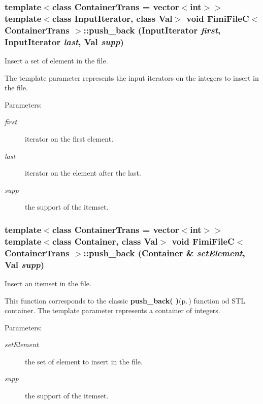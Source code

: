\subsubsection{\setlength{\rightskip}{0pt plus 5cm}template$<$class Container\-Trans = vector$<$int$>$$>$ template$<$class Input\-Iterator, class Val$>$ void {\bf Fimi\-File\-C}$<$ Container\-Trans $>$::push\_\-back (Input\-Iterator {\em first}, Input\-Iterator {\em last}, Val {\em supp})\hspace{0.3cm}{\tt  [inline]}}\label{class_fimi_file_c_cb730037deb90726936928570f29302d}


Insert a set of element in the file. 

The template parameter represents the input iterators on the integers to insert in the file. \begin{Desc}
\item[Parameters:]
\begin{description}
\item[{\em first}]iterator on the first element. \item[{\em last}]iterator on the element after the last. \item[{\em supp}]the support of the itemset. \end{description}
\end{Desc}
\subsubsection{\setlength{\rightskip}{0pt plus 5cm}template$<$class Container\-Trans = vector$<$int$>$$>$ template$<$class Container, class Val$>$ void {\bf Fimi\-File\-C}$<$ Container\-Trans $>$::push\_\-back (Container \& {\em set\-Element}, Val {\em supp})\hspace{0.3cm}{\tt  [inline]}}\label{class_fimi_file_c_9b2600d6e097c99865de506faebb061e}


Insert an itemset in the file. 

This function corresponds to the classic {\bf push\_\-back( )}{\rm (p.\,\pageref{class_fimi_file_c_9b2600d6e097c99865de506faebb061e})} function od STL container. The template parameter represents a container of integers. \begin{Desc}
\item[Parameters:]
\begin{description}
\item[{\em set\-Element}]the set of element to insert in the file. \item[{\em supp}]the support of the itemset. \end{description}
\end{Desc}
